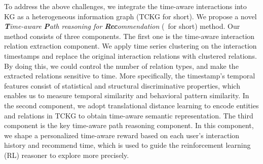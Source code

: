 To address the above challenges, 
we integrate the time-aware interactions into KG as a 
heterogeneous information graph (TCKG for short).
%
We propose a novel
{\it \textbf{T}ime-aware \textbf{P}ath reasoning for \textbf{Rec}ommendation}
(\tkgrec\ for short) method. 
Our method consists of three components.
%
The first one is the time-aware interaction relation extraction 
component.
%
We apply time series clustering on 
the interaction timestamps
and replace the original interaction relations with clustered relations.
By doing this, we could control the number of relation types, and make the 
extracted relations sensitive to time.
%
More specifically, the timestamp's temporal features consist of statistical and 
structural
discriminative properties, which enables us to measure temporal similarity and 
behavioral pattern similarity.  
%
In the second component, we adopt translational distance learning to 
encode entities and relations in TCKG to obtain
time-aware semantic representation.
%
The third component is the key time-aware path reasoning component.
%
In this component, we shape a personalized time-aware reward 
based on each user's interaction history and recommend time,
which is used to guide the reinforcement learning (RL) reasoner to explore more
precisely.
%
%
%


